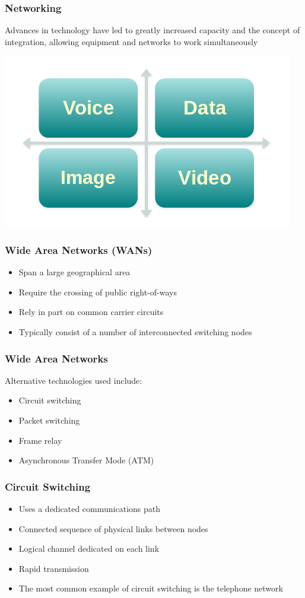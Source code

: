 \documentclass[pdflatex,compress]{beamer}
\begin{document}
\begin{frame}
	\frametitle{Networking}
	Advances in technology have led to greatly increased capacity and the concept of integration, allowing equipment and networks to work simultaneously
	\begin{center}
		\includegraphics[width=0.5\linewidth]{img/img10}
	\end{center}
\end{frame}

\begin{frame}
	\frametitle{Wide Area Networks (WANs)}
	\begin{itemize}
		\item Span a large geographical area
		\item Require the crossing of public right-of-ways
		\item Rely in part on common carrier circuits
		\item Typically consist of a number of interconnected switching nodes
	\end{itemize}
\end{frame}

\begin{frame}
	\frametitle{Wide Area Networks}
	Alternative technologies used include:
	\begin{itemize}
		\item Circuit switching
		\item Packet switching
		\item Frame relay
		\item Asynchronous Transfer Mode (ATM)
	\end{itemize}
\end{frame}

\begin{frame}
	\frametitle{Circuit Switching}
	\begin{itemize}
		\item Uses a dedicated communications path
		\item Connected sequence of physical links between nodes
		\item Logical channel dedicated on each link
		\item Rapid transmission
		\item The most common example of circuit switching is the telephone network
	\end{itemize}
\end{frame}
\end{document}
